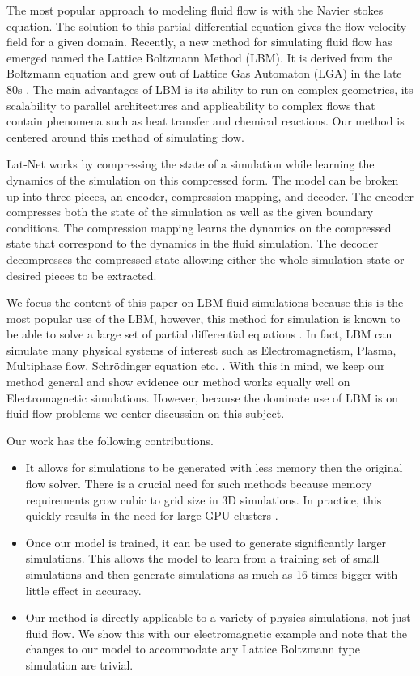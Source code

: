 \documentclass{article}
\begin{document}
The most popular approach to modeling fluid flow is with the Navier stokes equation. The solution to this partial differential equation gives the flow velocity field for a given domain. Recently, a new method for simulating fluid flow has emerged named the Lattice Boltzmann Method (LBM). It is derived from the Boltzmann equation and grew out of Lattice Gas Automaton (LGA) in the late 80s \cite{mcnamara1988use}. The main advantages of LBM is its ability to run on complex geometries, its scalability to parallel architectures and applicability to complex flows that contain phenomena such as heat transfer and chemical reactions. Our method is centered around this method of simulating flow.

Lat-Net works by compressing the state of a simulation while learning the dynamics of the simulation on this compressed form. The model can be broken up into three pieces, an encoder, compression mapping, and decoder. The encoder compresses both the state of the simulation as well as the given boundary conditions. The compression mapping learns the dynamics on the compressed state that correspond to the dynamics in the fluid simulation. The decoder decompresses the compressed state allowing either the whole simulation state or desired pieces to be extracted.

We focus the content of this paper on LBM fluid simulations because this is the most popular use of the LBM, however, this method for simulation is known to be able to solve a large set of partial differential equations \cite{galindolattice}. In fact, LBM can simulate many physical systems of interest such as Electromagnetism, Plasma, Multiphase flow, Schrödinger equation etc. \cite{mendoza2010three} \cite{kim2008wavelet} \cite{zhong2006lattice} \cite{shan1993lattice}. With this in mind, we keep our method general and show evidence our method works equally well on Electromagnetic simulations. However, because the dominate use of LBM is on fluid flow problems we center discussion on this subject.

Our work has the following contributions.
\begin{itemize}
  \item It allows for simulations to be generated with less memory then the original flow solver. There is a crucial need for such methods because memory requirements grow cubic to grid size in 3D simulations. In practice, this quickly results in the need for large GPU clusters \cite{onodera2013large} \cite{xian2011multi}.
  \item Once our model is trained, it can be used to generate significantly larger simulations. This allows the model to learn from a training set of small simulations and then generate simulations as much as 16 times bigger with little effect in accuracy.
  \item Our method is directly applicable to a variety of physics simulations, not just fluid flow. We show this with our electromagnetic example and note that the changes to our model to accommodate any Lattice Boltzmann type simulation are trivial.
\end{itemize}
\end{document}
